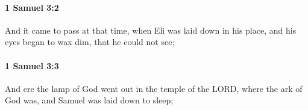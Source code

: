 		\paragraph{1 Samuel 3:2} %
			\label{1SAMUEL-3-2}

			And it came to pass at that time, when Eli was laid down in his place, and his eyes began to wax dim, that he could not see;


		\paragraph{1 Samuel 3:3} %
			\label{1SAMUEL-3-3}

			And ere the lamp of God went out in the temple of the LORD, where the ark of God was, and Samuel was laid down to sleep;


